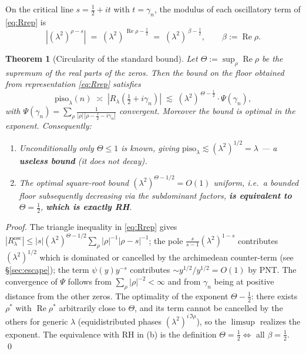 \documentclass[11pt]{article}
\theoremstyle{plain}
\newtheorem{theorem}{Theorem}
\theoremstyle{definition}
\DeclareMathOperator{\Real}{Re}
\newcommand{\half}{\tfrac12}
\begin{document}
On the critical line $s=\half+it$ with $t=\gamma_n$, the modulus of each oscillatory
term of \eqref{eq:Rrep} is
\[
  \left|(\lambda^2)^{\rho-s}\right|
  \;=\;(\lambda^2)^{\,\Real\rho-\half}
  \;=\;(\lambda^2)^{\,\beta-\half},
  \qquad \beta:=\Real\rho .
\]

\begin{theorem}[Circularity of the standard bound]\label{thm:circ}
Let $\Theta:=\sup_\rho\Real\rho$ be the supremum of the real parts of the zeros.
Then the bound on the floor obtained from representation \eqref{eq:Rrep} satisfies
\begin{equation}\label{eq:bound}
  \mathrm{piso}_\lambda(n)\;\asymp\;|R_\lambda(\half+i\gamma_n)|
  \;\lesssim\;(\lambda^2)^{\,\Theta-\half}\cdot\Psi(\gamma_n),
\end{equation}
with $\Psi(\gamma_n)=\sum_\rho\frac{1}{|\rho|\,|\rho-\half-i\gamma_n|}$ convergent.
Moreover the bound is optimal in the exponent. Consequently:
\begin{enumerate}[label=\textbf{(\alph*)},leftmargin=2em]
\item \emph{Unconditionally} only $\Theta\le1$ is known, giving
$\mathrm{piso}_\lambda\lesssim(\lambda^2)^{1/2}=\lambda$ --- a \textbf{useless bound}
(it does not decay).
\item The optimal square-root bound $(\lambda^2)^{\Theta-1/2}=O(1)$ uniform,
i.e.\ a bounded floor subsequently decreasing via the subdominant factors,
\textbf{is equivalent to} $\Theta=\half$, \textbf{which is exactly RH}.
\end{enumerate}
\end{theorem}
\begin{proof}
The triangle inequality in \eqref{eq:Rrep} gives
$|R_\lambda^{\mathrm{osc}}|\le|s|(\lambda^2)^{\Theta-1/2}\sum_\rho|\rho|^{-1}|\rho-s|^{-1}$;
the pole $\frac{s}{s-1}(\lambda^2)^{1-s}$ contributes $(\lambda^2)^{1/2}$ which is dominated
or cancelled by the archimedean counter-term (see \S\ref{sec:escape}); the
term $\psi(y)y^{-s}$ contributes $\sim y^{1/2}/y^{1/2}=O(1)$ by PNT. The convergence
of $\Psi$ follows from $\sum_\rho|\rho|^{-2}<\infty$ and from $\gamma_n$ being at
positive distance from the other zeros. The optimality of the exponent $\Theta-\half$:
there exists $\rho^\ast$ with $\Real\rho^\ast$ arbitrarily close to $\Theta$, and its
term cannot be cancelled by the others for generic $\lambda$ (equidistributed phases
$(\lambda^2)^{i\,\Im\rho}$), so the $\limsup$ realizes the
exponent. The equivalence with RH in (b) is the definition $\Theta=\half
\Leftrightarrow$ all $\beta=\half$. \qed
\end{proof}
\end{document}
